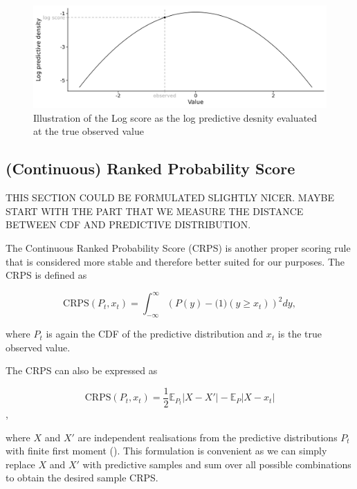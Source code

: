 \documentclass[
]{book}
\begin{document}
\begin{figure}
\includegraphics[width=1\linewidth]{../visualisation/chapter-3-evaluation/log-score-example} \caption{Illustration of the Log score as the log predictive desnity evaluated at the true observed value}\label{fig:log-score}
\end{figure}

\hypertarget{continuous-ranked-probability-score}{%
\subsection{(Continuous) Ranked Probability Score}\label{continuous-ranked-probability-score}}

THIS SECTION COULD BE FORMULATED SLIGHTLY NICER. MAYBE START WITH THE PART THAT WE MEASURE THE DISTANCE BETWEEN CDF AND PREDICTIVE DISTRIBUTION.

The Continuous Ranked Probability Score (CRPS) \citep{mathesonScoringRulesContinuous1976, gneitingStrictlyProperScoring2007} is another proper scoring rule that is considered more stable and therefore better suited for our purposes. The CRPS is defined as

\begin{equation}
\label{eq:crps}
\text{CRPS}(P_t, x_t) = \int_{-\infty}^\infty \left( P(y) - \mathbb(1)(y \geq x_t) \right)^2 dy,
\end{equation}

where \(P_t\) is again the CDF of the predictive distribution and \(x_t\) is the true observed value.

The CRPS can also be expressed as

\[ \text{CRPS}(P_t, x_t) = \frac{1}{2} \mathbb{E}_{P_t} |X - X'| - \mathbb{E}_P |X - x_t| \],

where \(X\) and \(X'\) are independent realisations from the predictive distributions \(P_t\) with finite first moment (\citet{gneitingStrictlyProperScoring2007}). This formulation is convenient as we can simply replace \(X\) and \(X'\) with predictive samples and sum over all possible combinations to obtain the desired sample CRPS.
\end{document}
